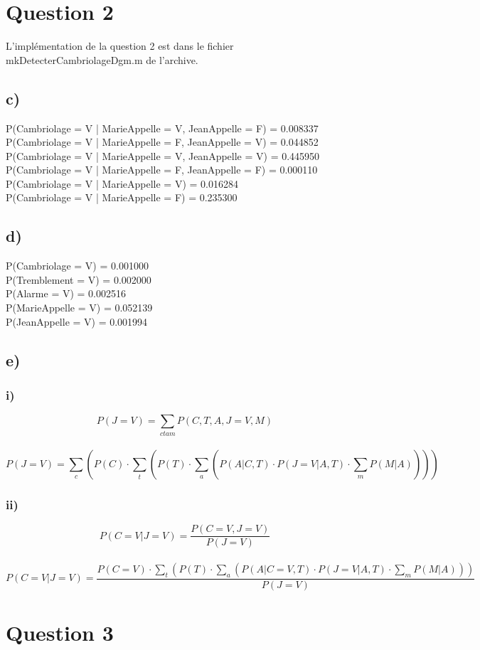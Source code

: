 \documentclass[a4paper, 12pt]{article} %
\begin{document}
\section*{Question 2}
L'implémentation de la question 2 est dans le fichier mkDetecterCambriolageDgm.m de l'archive.
\subsection*{c)}
P(Cambriolage = V | MarieAppelle = V, JeanAppelle = F) = 0.008337\\
P(Cambriolage = V | MarieAppelle = F, JeanAppelle = V) = 0.044852\\
P(Cambriolage = V | MarieAppelle = V, JeanAppelle = V) = 0.445950\\
P(Cambriolage = V | MarieAppelle = F, JeanAppelle = F) = 0.000110\\
P(Cambriolage = V | MarieAppelle = V) = 0.016284\\
P(Cambriolage = V | MarieAppelle = F) = 0.235300\\
\subsection*{d)} 
P(Cambriolage = V) = 0.001000\\
P(Tremblement = V) = 0.002000\\
P(Alarme = V) = 0.002516\\
P(MarieAppelle = V) = 0.052139\\
P(JeanAppelle = V) = 0.001994\\
\subsection*{e)}
\subsubsection*{i)}
\begin{equation*}
P(J=V) = \sum_{ctam}{P(C,T,A,J=V,M)}
\end{equation*}
\\
\begin{equation*}
P(J=V) = \sum_{c} (P(C) \cdot \sum_{t} (P(T) \cdot \sum_{a} (P(A|C,T) \cdot P(J=V|A,T) \cdot \sum_{m} P(M|A))))
\end{equation*}
\subsubsection*{ii)}
\begin{equation*}
P(C=V|J=V) = \frac{P(C=V,J=V)}{P(J=V)}
\end{equation*}
\\
\begin{equation*}
P(C=V|J=V) = \frac{P(C=V) \cdot \sum_{t} (P(T) \cdot \sum_{a} (P(A|C=V,T) \cdot P(J=V|A,T) \cdot \sum_{m} P(M|A)))}{P(J=V)}
\end{equation*}
\section*{Question 3}
\end{document}
